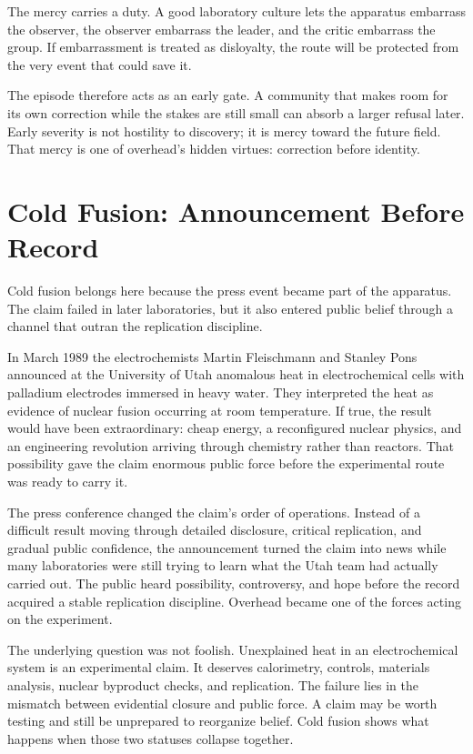 The mercy carries a duty. A good laboratory culture lets the apparatus
embarrass the observer, the observer embarrass the leader, and the critic
embarrass the group. If embarrassment is treated as disloyalty, the route
will be protected from the very event that could save it.

The episode therefore acts as an early gate. A community that makes room
for its own correction while the stakes are still small can absorb a larger
refusal later. Early severity is not hostility to discovery; it is mercy
toward the future field. That mercy is one of overhead's hidden virtues:
correction before identity.

\section{Cold Fusion: Announcement Before Record}

Cold fusion belongs here because the press event became part of the
apparatus. The claim failed in later laboratories, but it also entered
public belief through a channel that outran the replication discipline.

In March 1989 the electrochemists Martin Fleischmann and Stanley Pons
announced at the University of Utah anomalous heat in electrochemical cells
with palladium electrodes immersed in heavy water. They interpreted the
heat as evidence of nuclear fusion occurring at room temperature. If true,
the result would have been extraordinary: cheap energy, a reconfigured
nuclear physics, and an engineering revolution arriving through chemistry
rather than reactors. That possibility gave the claim enormous public
force before the experimental route was ready to carry it.

The press conference changed the claim's order of operations. Instead of a
difficult result moving through detailed disclosure, critical replication,
and gradual public confidence, the announcement turned the claim into news
while many laboratories were still trying to learn what the Utah team
had actually carried out. The public heard possibility, controversy, and hope before
the record acquired a stable replication discipline. Overhead became one
of the forces acting on the experiment.

The underlying question was not foolish. Unexplained heat in an
electrochemical system is an experimental claim. It deserves calorimetry,
controls, materials analysis, nuclear byproduct checks, and replication.
The failure lies in the mismatch between evidential closure and public
force. A claim may be worth testing and still be unprepared to reorganize
belief. Cold fusion shows what happens when those two statuses collapse
together.

